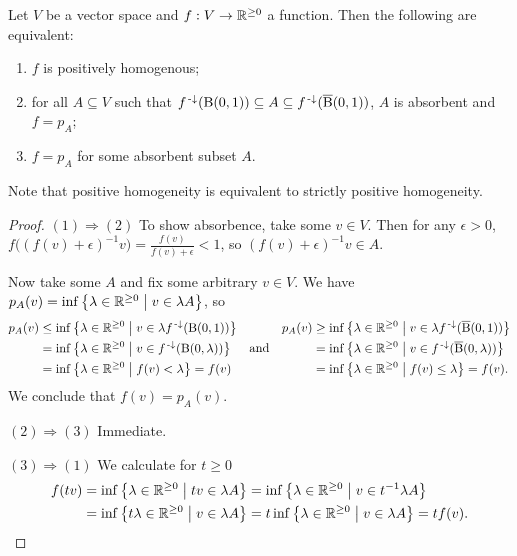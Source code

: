 \begin{proposition} \label{gaugeClassification}
Let $V$ be a vector space and $f: V\to \mathbb{R}^{\geq 0}$ a function.
Then the following are equivalent:
\begin{enumerate}
\item $f$ is positively homogenous;
\item for all $A\subseteq V$ such that $f^{{\text{\hspace{0.15em}-}\downarrow}}(\operatorname{B}(0,1)) \subseteq A \subseteq f^{{\text{\hspace{0.15em}-}\downarrow}}(\operatorname{\overline{B}}(0,1))$, $A$ is absorbent and $f = p_A$;
\item $f = p_A$ for some absorbent subset $A$.
\end{enumerate}
\end{proposition}
Note that positive homogeneity is equivalent to strictly positive homogeneity.
\begin{proof}
$(1) \Rightarrow (2)$ To show absorbence, take some $v\in V$. Then for any $\epsilon>0$, $f\big((f(v)+\epsilon)^{-1}v\big) = \frac{f(v)}{f(v)+\epsilon} < 1$, so $(f(v)+\epsilon)^{-1}v\in A$.

Now take some $A$ and fix some arbitrary $v\in V$. We have $p_A(v) = \inf\left\{ \lambda\in \mathbb{R}^{\geq 0} \;\middle|\; v\in \lambda A \right\}$, so
\[ \begin{aligned}
p_A(v) &\leq \inf\left\{ \lambda\in \mathbb{R}^{\geq 0} \;\middle|\; v\in \lambda f^{{\text{\hspace{0.15em}-}\downarrow}}(\operatorname{B}(0,1)) \right\} \\
&= \inf\left\{ \lambda\in \mathbb{R}^{\geq 0} \;\middle|\; v\in f^{{\text{\hspace{0.15em}-}\downarrow}}(\operatorname{B}(0,\lambda)) \right\} \\
&= \inf\left\{ \lambda\in \mathbb{R}^{\geq 0} \;\middle|\; f(v) < \lambda \right\} = f(v)
\end{aligned} \quad\text{and}\quad \begin{aligned}
p_A(v) &\geq \inf\left\{ \lambda\in \mathbb{R}^{\geq 0} \;\middle|\; v\in \lambda f^{{\text{\hspace{0.15em}-}\downarrow}}(\operatorname{\overline{B}}(0,1)) \right\} \\
&= \inf\left\{ \lambda\in \mathbb{R}^{\geq 0} \;\middle|\; v\in f^{{\text{\hspace{0.15em}-}\downarrow}}(\operatorname{\overline{B}}(0,\lambda)) \right\} \\
&= \inf\left\{ \lambda\in \mathbb{R}^{\geq 0} \;\middle|\; f(v) \leq \lambda \right\} = f(v).
\end{aligned} \]
We conclude that $f(v) = p_A(v)$.

$(2) \Rightarrow (3)$ Immediate.

$(3) \Rightarrow (1)$ We calculate for $t \geq 0$
\begin{align*}
f(tv) &= \inf\left\{ \lambda\in \mathbb{R}^{\geq 0} \;\middle|\; tv\in \lambda A \right\} = \inf\left\{ \lambda\in \mathbb{R}^{\geq 0} \;\middle|\; v\in t^{-1}\lambda A \right\} \\
&= \inf\left\{ t\lambda\in \mathbb{R}^{\geq 0} \;\middle|\; v\in \lambda A \right\} = t\inf\left\{ \lambda\in \mathbb{R}^{\geq 0} \;\middle|\; v\in \lambda A \right\} = tf(v).
\end{align*}
\end{proof}

